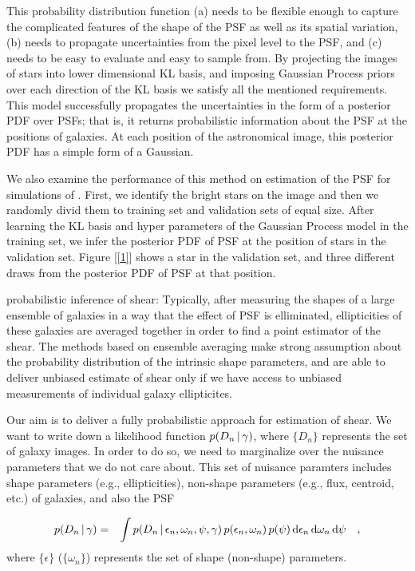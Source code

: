 \documentclass[12pt]{article}
\newcommand{\dd}{\mathrm{d}}
\newcommand{\data}{D}
\newcommand{\intrinsic}{\epsilon}
\newcommand{\shear}{\gamma}
\newcommand{\psf}{\psi}
\begin{document}
This probability distribution function (a) needs to be flexible enough to capture the complicated 
features of the shape of the PSF as well as its spatial variation, (b) needs to propagate uncertainties
from the pixel level to the PSF, and (c) needs to be easy to evaluate and easy to sample from. By 
projecting the images of stars into lower dimensional KL basis, and imposing Gaussian Process priors 
over each direction of the KL basis we satisfy all the mentioned requirements. This model successfully propagates
the uncertainties in the form of a posterior PDF over PSFs; 
that is, it returns probabilistic information about the PSF at the positions of galaxies. At each
position of the astronomical image, this posterior PDF has a simple form of a Gaussian.

We also examine the performance of this method on estimation of the PSF for simulations 
of \lsst. First, we identify the bright stars on the image and then we randomly divid
them to training set and validation sets of equal size. After learning the KL basis and 
hyper parameters of the Gaussian Process model in the training set, we infer the posterior 
PDF of PSF at the position of stars in the validation set. Figure [\ref{1}] shows a star
in the validation set, and three different draws from the posterior PDF of PSF at that position.

probabilistic inference of shear:
Typically, after measuring the shapes
of a large ensemble of galaxies in a way that
the effect of PSF is elliminated, ellipticities
of these galaxies are averaged together in order to
find a point estimator of the shear.
The methods based on ensemble averaging make strong assumption
about the probability distribution of the intrinsic shape parameters,
and are able to deliver unbiased estimate of shear only if we
have access to unbiased measurements of individual galaxy
ellipticites. 

Our aim is to deliver a fully probabilistic approach for estimation of shear.
We want to write down a likelihood function $p(\data_n\given\shear)$, where $\{\data_n\}$
represents the set of galaxy images. In order to do so, we need to marginalize over the
nuisance parameters that we do not care about. This set of nuisance paramters includes 
shape parameters (e.g., ellipticities), non-shape parameters (e.g., flux, centroid, etc.)
of galaxies, and also the PSF

\begin{eqnarray}
p(\data_n\given\shear)
  &=& \int p(\data_n\given\intrinsic_n , \omega_{n}, \psf , \shear)
  \,p(\intrinsic_n, \omega_{n})\,p(\psf)\,\dd\intrinsic_n\,\dd\omega_n\,\dd\psf
  \quad ,
\label{integral}
\end{eqnarray}
where $\{\intrinsic\}$ ($\{\omega_{n}\}$) represents the set of shape
(non-shape) parameters.
\end{document}

